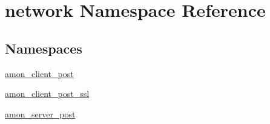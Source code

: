 \hypertarget{namespacenetwork}{\section{network Namespace Reference}
\label{namespacenetwork}
}
\subsection*{Namespaces}
\begin{DoxyCompactItemize}
\item 
\hyperlink{namespacenetwork_1_1amon__client__post}{amon\-\_\-client\-\_\-post}
\item 
\hyperlink{namespacenetwork_1_1amon__client__post__ssl}{amon\-\_\-client\-\_\-post\-\_\-ssl}
\item 
\hyperlink{namespacenetwork_1_1amon__server__post}{amon\-\_\-server\-\_\-post}
\end{DoxyCompactItemize}
